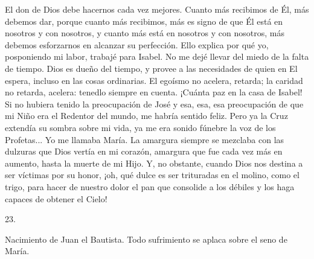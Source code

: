 \documentclass[12pt]{book} %
\begin{document}
El don de Dios debe hacernos cada vez mejores. Cuanto más recibimos de Él, más debemos dar, porque cuanto más recibimos, más es signo de que Él está en nosotros y con nosotros, y cuanto más está en nosotros y con nosotros, más debemos esforzarnos en alcanzar su perfección. 
Ello explica por qué yo, posponiendo mi labor, trabajé para Isabel. No me dejé llevar del miedo de la falta de tiempo. Dios es dueño del tiempo, y provee a las necesidades de quien en El espera, incluso en las cosas ordinarias. El egoísmo no acelera, retarda; la caridad no retarda, acelera: tenedlo siempre en cuenta. 
¡Cuánta paz en la casa de Isabel! Si no hubiera tenido la preocupación de José y esa, esa, esa preocupación de que mi Niño era el Redentor del mundo, me habría sentido feliz. Pero ya la Cruz extendía su sombra sobre mi vida, ya me era sonido fúnebre la voz de los Profetas... 
Yo me llamaba María. La amargura siempre se mezclaba con las dulzuras que Dios vertía en mi corazón, amargura que 
fue cada vez más en aumento, hasta la muerte de mi Hijo. Y, no obstante, cuando Dios nos destina a ser víctimas por su honor, ¡oh, qué dulce es ser trituradas en el molino, como el trigo, para hacer de nuestro  dolor el pan que consolide a los débiles y los haga capaces de obtener el Cielo! 
 
 
23. 
 
Nacimiento de Juan el Bautista. Todo sufrimiento se aplaca sobre el seno de María. 
 
\end{document}
